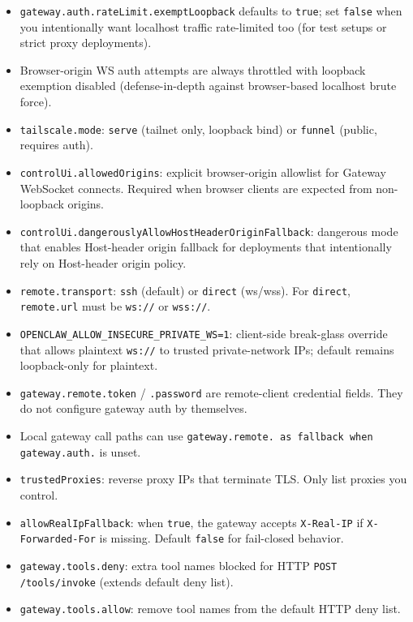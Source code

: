 \begin{itemize}
  \item \texttt{gateway.auth.rateLimit.exemptLoopback} defaults to \texttt{true}; set \texttt{false} when you intentionally want localhost traffic rate-limited too (for test setups or strict proxy deployments).
  \item Browser-origin WS auth attempts are always throttled with loopback exemption disabled (defense-in-depth against browser-based localhost brute force).
  \item \texttt{tailscale.mode}: \texttt{serve} (tailnet only, loopback bind) or \texttt{funnel} (public, requires auth).
  \item \texttt{controlUi.allowedOrigins}: explicit browser-origin allowlist for Gateway WebSocket connects. Required when browser clients are expected from non-loopback origins.
  \item \texttt{controlUi.dangerouslyAllowHostHeaderOriginFallback}: dangerous mode that enables Host-header origin fallback for deployments that intentionally rely on Host-header origin policy.
  \item \texttt{remote.transport}: \texttt{ssh} (default) or \texttt{direct} (ws/wss). For \texttt{direct}, \texttt{remote.url} must be \texttt{ws://} or \texttt{wss://}.
  \item \texttt{OPENCLAW\_ALLOW\_INSECURE\_PRIVATE\_WS=1}: client-side break-glass override that allows plaintext \texttt{ws://} to trusted private-network IPs; default remains loopback-only for plaintext.
  \item \texttt{gateway.remote.token} / \texttt{.password} are remote-client credential fields. They do not configure gateway auth by themselves.
  \item Local gateway call paths can use \texttt{gateway.remote.\textit{} as fallback when \texttt{gateway.auth.}} is unset.
  \item \texttt{trustedProxies}: reverse proxy IPs that terminate TLS. Only list proxies you control.
  \item \texttt{allowRealIpFallback}: when \texttt{true}, the gateway accepts \texttt{X-Real-IP} if \texttt{X-Forwarded-For} is missing. Default \texttt{false} for fail-closed behavior.
  \item \texttt{gateway.tools.deny}: extra tool names blocked for HTTP \texttt{POST /tools/invoke} (extends default deny list).
  \item \texttt{gateway.tools.allow}: remove tool names from the default HTTP deny list.
\end{itemize}




